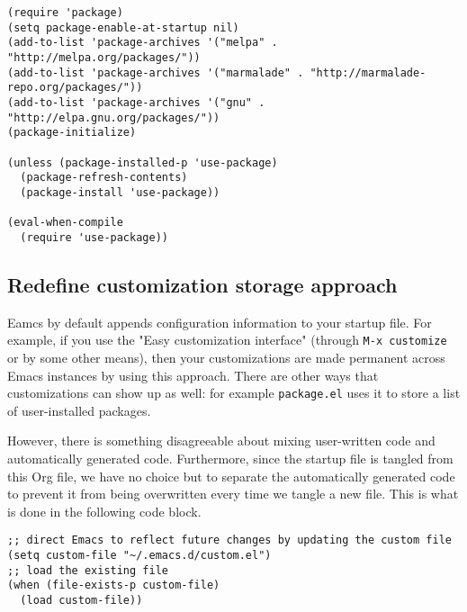 \documentclass[11pt]{article}
\begin{document}
\lstset{language=Lisp,label= ,caption= ,numbers=none}
\begin{lstlisting}
(require 'package)
(setq package-enable-at-startup nil)
(add-to-list 'package-archives '("melpa" . "http://melpa.org/packages/"))
(add-to-list 'package-archives '("marmalade" . "http://marmalade-repo.org/packages/"))
(add-to-list 'package-archives '("gnu" . "http://elpa.gnu.org/packages/"))
(package-initialize)

(unless (package-installed-p 'use-package)
  (package-refresh-contents)
  (package-install 'use-package))

(eval-when-compile
  (require 'use-package))
\end{lstlisting}




\subsection{Redefine customization storage approach}
\label{sec-1-2}

Eamcs by default appends configuration information to your startup file.  For
example, if you use the "Easy customization interface" (through \texttt{M-x customize}
or by some other means), then your customizations are made permanent across
Emacs instances by using this approach.  There are other ways that
customizations can show up as well: for example \texttt{package.el} uses it to store a
list of user-installed packages.

However, there is something disagreeable about mixing user-written code and
automatically generated code.  Furthermore, since the startup file is tangled
from this Org file, we have no choice but to separate the automatically
generated code to prevent it from being overwritten every time we tangle a new
file.  This is what is done in the following code block.

\lstset{language=Lisp,label= ,caption= ,numbers=none}
\begin{lstlisting}
;; direct Emacs to reflect future changes by updating the custom file
(setq custom-file "~/.emacs.d/custom.el")
;; load the existing file
(when (file-exists-p custom-file)
  (load custom-file))
\end{lstlisting}
\end{document}
